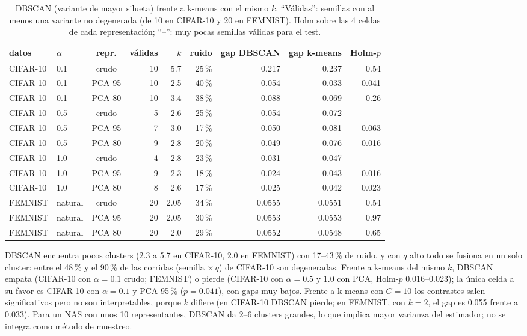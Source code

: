 \documentclass[11pt,a4paper]{article}
\begin{document}
\begin{table}[h]
\centering\small
\begin{tabular}{llcrrrrrr}
\toprule
datos & $\alpha$ & repr. & válidas & $k$ & ruido & gap DBSCAN & gap k-means & Holm-$p$\\
\midrule
CIFAR-10 & 0.1 & crudo & 10 & 5.7 & 25\,\% & 0.217 & 0.237 & 0.54\\
CIFAR-10 & 0.1 & PCA 95 & 10 & 2.5 & 40\,\% & 0.054 & 0.033 & 0.041\\
CIFAR-10 & 0.1 & PCA 80 & 10 & 3.4 & 38\,\% & 0.088 & 0.069 & 0.26\\
CIFAR-10 & 0.5 & crudo & 5 & 2.6 & 25\,\% & 0.054 & 0.072 & --\\
CIFAR-10 & 0.5 & PCA 95 & 7 & 3.0 & 17\,\% & 0.050 & 0.081 & 0.063\\
CIFAR-10 & 0.5 & PCA 80 & 9 & 2.8 & 20\,\% & 0.049 & 0.076 & 0.016\\
CIFAR-10 & 1.0 & crudo & 4 & 2.8 & 23\,\% & 0.031 & 0.047 & --\\
CIFAR-10 & 1.0 & PCA 95 & 9 & 2.3 & 18\,\% & 0.024 & 0.043 & 0.016\\
CIFAR-10 & 1.0 & PCA 80 & 8 & 2.6 & 17\,\% & 0.025 & 0.042 & 0.023\\
FEMNIST & natural & crudo & 20 & 2.05 & 34\,\% & 0.0555 & 0.0551 & 0.54\\
FEMNIST & natural & PCA 95 & 20 & 2.05 & 30\,\% & 0.0553 & 0.0553 & 0.97\\
FEMNIST & natural & PCA 80 & 20 & 2.0 & 29\,\% & 0.0552 & 0.0548 & 0.65\\
\bottomrule
\end{tabular}
\caption{DBSCAN (variante de mayor silueta) frente a k-means con el mismo $k$. ``Válidas'': semillas con al menos una variante no degenerada (de 10 en CIFAR-10 y 20 en FEMNIST). Holm sobre las 4 celdas de cada representación; ``--'': muy pocas semillas válidas para el test.}
\label{tab:db}
\end{table}

DBSCAN encuentra pocos clusters (2.3 a 5.7 en CIFAR-10, 2.0 en FEMNIST) con 17--43\,\% de ruido, y con $q$ alto todo se fusiona en un solo cluster: entre el 48\,\% y el 90\,\% de las corridas (semilla $\times\,q$) de CIFAR-10 son degeneradas. Frente a k-means del mismo $k$, DBSCAN empata (CIFAR-10 con $\alpha=0.1$ crudo; FEMNIST) o pierde (CIFAR-10 con $\alpha=0.5$ y $1.0$ con PCA, Holm-$p$ 0.016--0.023); la única celda a su favor es CIFAR-10 con $\alpha=0.1$ y PCA 95\,\% ($p=0.041$), con gaps muy bajos. Frente a k-means con $C=10$ los contrastes salen significativos pero no son interpretables, porque $k$ difiere (en CIFAR-10 DBSCAN pierde; en FEMNIST, con $k=2$, el gap es 0.055 frente a 0.033). Para un NAS con unos 10 representantes, DBSCAN da 2--6 clusters grandes, lo que implica mayor varianza del estimador; no se integra como método de muestreo.
\end{document}
